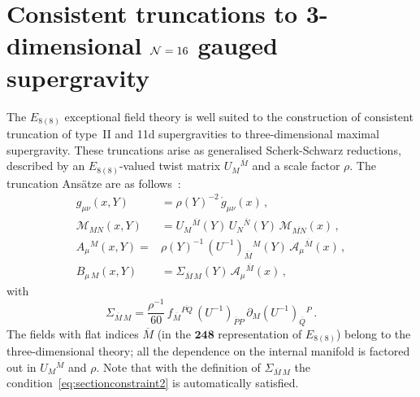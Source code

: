 \documentclass[a4paper, 11pt]{article}
\numberwithin{equation}{section}
\newcommand{\ov}[1]{\overline{#1}}
\newcommand{\EE}{\ensuremath{E_{8(8)}}\xspace}
\newcommand{\+}{\oplus}
\newcommand{\UI}{\left(U^{-1}\right)}
\newcommand{\fl}[1]{\ov{#1}}
\newcommand{\M}{\ensuremath{\mathcal{M}}\xspace}
\newcommand{\A}{\ensuremath{\mathcal{A}}\xspace}
\begin{document}
\section{Consistent truncations to 3-dimensional \texorpdfstring{${\cal N}=16$}{N=16} gauged supergravity} \label{s:TruncationReview}
The \EE exceptional field theory is well suited to the construction of consistent truncation of type~II and 11d supergravities to three-dimensional maximal supergravity. These truncations arise as generalised Scherk-Schwarz reductions, described by an \EE-valued twist matrix $U_{M}{}^{\fl{M}}$ and a scale factor $\rho$. The truncation Ansätze are as follows~\cite{Galli:2022idq}:
\begin{equation} \label{eq:GSSansatz}
	\begin{aligned}
		g_{\mu\nu}(x,Y)&=\rho(Y)^{-2}\,\mathring{g}_{\mu\nu}(x)\,,\\
		\M_{MN}(x,Y)&=U_{M}{}^{\fl{M}}(Y)\,U_{N}{}^{\fl{N}}(Y)\,\M_{\fl{MN}}(x)\,,\\
		A_{\mu}{}^{M}(x,Y)=&\rho(Y)^{-1}\,\UI_{\fl{M}}{}^{M}(Y)\,\A_{\mu}{}^{\fl{M}}(x)\,,\\
		B_{\mu\,M}(x,Y)&=\Sigma_{\fl{M}\,M}(Y)\,\A_{\mu}{}^{\fl{M}}(x)\,,
	\end{aligned}
\end{equation}
with
\begin{equation}
	\Sigma_{\fl{M}\,M}=\frac{\rho^{-1}}{60}\,f_{\fl{M}}{}^{\fl{PQ}}\,\UI_{\fl{P}P}\,\partial_{M}\UI_{\fl{Q}}{}^{P}\,.
\end{equation}
The fields with flat indices $\fl{M}$ (in the $\mathbf{248}$ representation of \EE) belong to the three-dimensional theory; all the dependence on the internal manifold is factored out in $U_{M}{}^{\fl{M}}$ and $\rho$. Note that with the definition of $\Sigma_{\fl{M}\,M}$ the condition~\eqref{eq:sectionconstraint2} is automatically satisfied.
\end{document}
